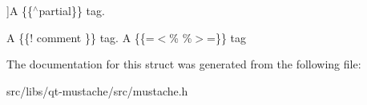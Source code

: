 \begin{Desc}
\begin{description}
{}]A \{\{$^\wedge$partial\}\} tag. \item[{\em 
\hypertarget{structMustache_1_1Tag_ab702ed1288811f8bb16d76babfdb6472a680bf1878bdfa8c7ed5a594603b638be}{}Set\+Delimiter\label{structMustache_1_1Tag_ab702ed1288811f8bb16d76babfdb6472a680bf1878bdfa8c7ed5a594603b638be}
}]A \{\{! comment \}\} tag. A \{\{=$<$\% \%$>$=\}\} tag \end{description}
\end{Desc}


The documentation for this struct was generated from the following file\+:\begin{DoxyCompactItemize}
\item 
src/libs/qt-\/mustache/src/mustache.\+h\end{DoxyCompactItemize}
